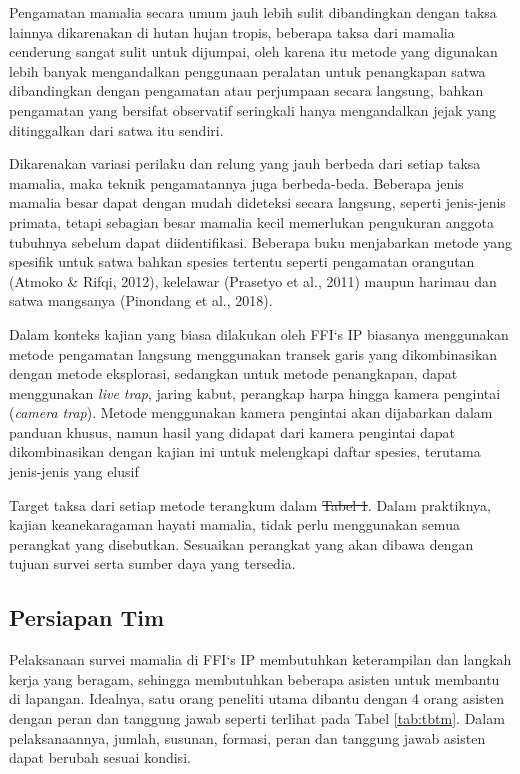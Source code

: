 \documentclass[
  oneside]{book}
\begin{document}
Pengamatan mamalia secara umum jauh lebih sulit dibandingkan dengan taksa lainnya dikarenakan di hutan hujan tropis, beberapa taksa dari mamalia cenderung sangat sulit untuk dijumpai, oleh karena itu metode yang digunakan lebih banyak mengandalkan penggunaan peralatan untuk penangkapan satwa dibandingkan dengan pengamatan atau perjumpaan secara langsung, bahkan pengamatan yang bersifat observatif seringkali hanya mengandalkan jejak yang ditinggalkan dari satwa itu sendiri.

Dikarenakan variasi perilaku dan relung yang jauh berbeda dari setiap taksa mamalia, maka teknik pengamatannya juga berbeda-beda. Beberapa jenis mamalia besar dapat dengan mudah dideteksi secara langsung, seperti jenis-jenis primata, tetapi sebagian besar mamalia kecil memerlukan pengukuran anggota tubuhnya sebelum dapat diidentifikasi. Beberapa buku menjabarkan metode yang spesifik untuk satwa bahkan spesies tertentu seperti pengamatan orangutan (Atmoko \& Rifqi, 2012), kelelawar (Prasetyo et al., 2011) maupun harimau dan satwa mangsanya (Pinondang et al., 2018).

Dalam konteks kajian yang biasa dilakukan oleh FFI`s IP biasanya menggunakan metode pengamatan langsung menggunakan transek garis yang dikombinasikan dengan metode eksplorasi, sedangkan untuk metode penangkapan, dapat menggunakan \emph{live trap}, jaring kabut, perangkap harpa hingga kamera pengintai (\emph{camera trap}). Metode menggunakan kamera pengintai akan dijabarkan dalam panduan khusus, namun hasil yang didapat dari kamera pengintai dapat dikombinasikan dengan kajian ini untuk melengkapi daftar spesies, terutama jenis-jenis yang elusif

Target taksa dari setiap metode terangkum dalam \sout{Tabel 1}. Dalam praktiknya, kajian keanekaragaman hayati mamalia, tidak perlu menggunakan semua perangkat yang disebutkan. Sesuaikan perangkat yang akan dibawa dengan tujuan survei serta sumber daya yang tersedia.

\hypertarget{persiapan-tim-2}{%
\subsection*{Persiapan Tim}\label{persiapan-tim-2}}

Pelaksanaan survei mamalia di FFI`s IP membutuhkan keterampilan dan langkah kerja yang beragam, sehingga membutuhkan beberapa asisten untuk membantu di lapangan. Idealnya, satu orang peneliti utama dibantu dengan 4 orang asisten dengan peran dan tanggung jawab seperti terlihat pada Tabel \ref{tab:tbtm}. Dalam pelaksanaannya, jumlah, susunan, formasi, peran dan tanggung jawab asisten dapat berubah sesuai kondisi.
\end{document}
